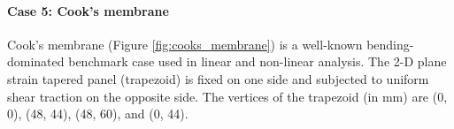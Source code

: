 \documentclass[sn-mathphys,Numbered]{sn-jnl}%
\begin{document}
\paragraph{Case 5: Cook's membrane}
Cook's membrane (Figure \ref{fig:cooks_membrane}) is a well-known bending-dominated benchmark case used in linear and non-linear analysis.
The 2-D plane strain tapered panel (trapezoid) is fixed on one side and subjected to uniform shear traction on the opposite side.
The vertices of the trapezoid (in mm) are (0, 0), (48, 44), (48, 60),  and (0, 44).
\end{document}
